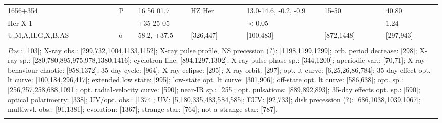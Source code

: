 \documentclass{aa}
\begin{document}
\begin{tabular}{p{2.5cm}p{1cm}p{1.8cm}p{2.3cm}p{3.3cm}p{2.0cm}p{2.2cm}}
\noalign{\smallskip}
1656+354                  & P           & 16 56 01.7           & HZ Her        & 13.0-14.6, -0.2, -0.9   & 15-50          & 40.80        \\
Her X-1                      &              & +35 25 05            &                       & $<$0.05                       &                     & 1.24            \\
U,M,A,H,G,X,B,AS  & o           & 58.2, +37.5          & [326,447]     & [100,483]                      & [872,1448]  & [297,943]  \\
\\
\multicolumn{7}{p{17.5cm}}{
$Pos$.: [103]; X-ray obs.: [299,732,1004,1133,1152]; X-ray pulse profile, NS precession (?): [1198,1199,1299]; orb. period 
decrease: [298]; X-ray sp.: [280,780,895,975,978,1380,1416]; cyclotron line: [894,1297,1302]; X-ray pulse-phase sp.: 
[344,1200]; aperiodic var.: [70,71]; X-ray behaviour chaotic: [958,1372]; 35-day cycle: [964]; X-ray eclipse: [295]; X-ray 
orbit: [297]; opt. lt curve: [6,25,26,86,784]; 35 day effect opt. lt curve: [100,184,296,417]; extended low state: [995]; 
low-state opt. lt curve: [301,906]; off-state opt. lt curve: [586,638]; opt. sp.: [256,257,258,688,1091]; opt. radial-velocity 
curve: [590]; near-IR sp.: [255]; opt. pulsations: [889,892,893]; 35-day effects opt. sp.: [590]; optical polarimetry: [338]; 
UV/opt. obs.: [1374]; UV: [5,180,335,483,584,585]; EUV: [92,733];  disk precession (?): [686,1038,1039,1067]; multiwvl. 
obs.: [91,1381]; evolution: [1367]; strange star: [764]; not a strange star: [787].}\\
\noalign{\smallskip}
\hline

\end{tabular}
\end{document}
